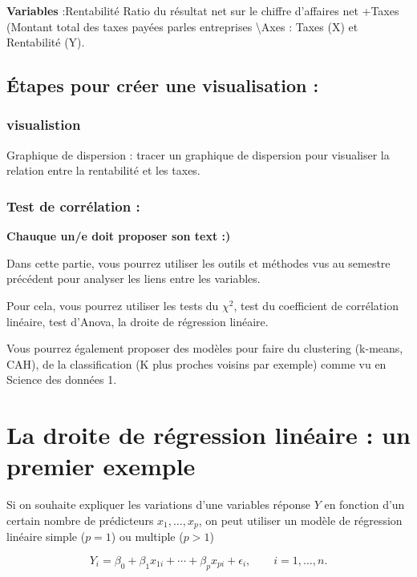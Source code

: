 \documentclass[mstat,12pt]{unswthesis}
\begin{document}
\textbf{Variables} :Rentabilité Ratio du résultat net sur le chiffre
d'affaires net +Taxes (Montant total des taxes payées parles entreprises
\textbackslash Axes : Taxes (X) et Rentabilité (Y).

\subsection{Étapes pour créer une visualisation
:}\label{uxe9tapes-pour-cruxe9er-une-visualisation-4}

\subsubsection{visualistion}\label{visualistion}

Graphique de dispersion : tracer un graphique de dispersion pour
visualiser la relation entre la rentabilité et les taxes.

\subsubsection{Test de corrélation :}\label{test-de-corruxe9lation}

\textbf{Chauque un/e doit proposer son text :) }

Dans cette partie, vous pourrez utiliser les outils et méthodes vus au
semestre précédent pour analyser les liens entre les variables.

Pour cela, vous pourrez utiliser les tests du \(\chi^2\), test du
coefficient de corrélation linéaire, test d'Anova, la droite de
régression linéaire.

Vous pourrez également proposer des modèles pour faire du clustering
(k-means, CAH), de la classification (K plus proches voisins par
exemple) comme vu en Science des données 1.

\section{La droite de régression linéaire : un premier
exemple}\label{la-droite-de-ruxe9gression-linuxe9aire-un-premier-exemple}

Si on souhaite expliquer les variations d'une variables réponse \(Y\) en
fonction d'un certain nombre de prédicteurs \(x_1,\ldots,x_p\), on peut
utiliser un modèle de régression linéaire simple (\(p=1\)) ou multiple
(\(p>1\))

\[
Y_i = \beta_0 + \beta_1 x_{1i} + \cdots +\beta_p x_{pi} + \epsilon_i, \qquad i=1,\ldots,n.
\]
\end{document}
